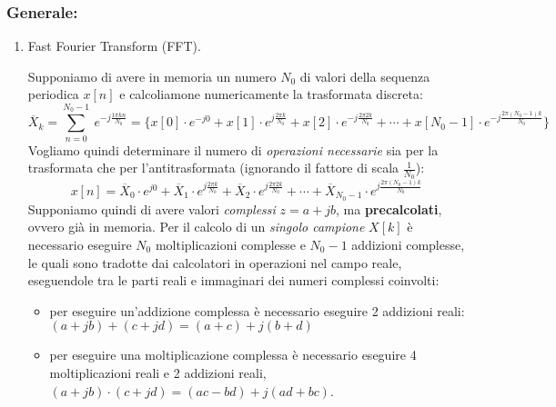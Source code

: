 \documentclass[
]{article}
\providecommand{\tightlist}{%
  \setlength{\itemsep}{0pt}\setlength{\parskip}{0pt}}
\begin{document}
\subsubsection{Generale:}\label{generale}

\begin{enumerate}
\def\labelenumi{\arabic{enumi}.}
\setcounter{enumi}{24}
\item
  Fast Fourier Transform (FFT).

  Supponiamo di avere in memoria un numero \(N_0\) di valori della
  sequenza periodica \(x[n]\) e calcoliamone numericamente la
  trasformata discreta: \[
  \overline{X}_k = \sum_{n=0}^{N_0 -1} \  e^{-j\frac{1\pi kn}{N_0}} =\Big\{ x[0]\cdot e^{-j0}+x[1]\cdot e^{j\frac{2\pi k}{N_0}}+x[2]\cdot e^{-j\frac{2\pi 2k}{N_0}} + \cdots + x[N_0 -1]\cdot e^{-j\frac{2\pi(N_0 -1)k}{N_0}}\Big\}
  \] Vogliamo quindi determinare il numero di \emph{operazioni
  necessarie} sia per la trasformata che per l'antitrasformata
  (ignorando il fattore di scala \(\frac{1}{N_0}\)): \[
  x[n] = \overline{X}_0 \cdot e^{j0}+\overline{X}_1\cdot e^{j\frac{2\pi k}{N_0}}+\overline{X}_2\cdot e^{j\frac{2\pi 2k}{N_0}} + \cdots + \overline{X}_{N_0 -1}\cdot e^{j\frac{2\pi(N_0 -1)k}{N_0}}
  \] Supponiamo quindi di avere valori \emph{complessi} \(z=a+jb\), ma
  \textbf{precalcolati}, ovvero già in memoria. Per il calcolo di un
  \emph{singolo campione} \(X[k]\) è necessario eseguire \(N_0\)
  moltiplicazioni complesse e \(N_0 -1\) addizioni complesse, le quali
  sono tradotte dai calcolatori in operazioni nel campo reale,
  eseguendole tra le parti reali e immaginari dei numeri complessi
  coinvolti:

  \begin{itemize}
  \tightlist
  \item
    per eseguire un'addizione complessa è necessario eseguire 2
    addizioni reali: \((a + jb) + (c + jd) = (a + c) + j(b + d)\)
  \item
    per eseguire una moltiplicazione complessa è necessario eseguire 4
    moltiplicazioni reali e 2 addizioni reali,
    \((a + jb) \cdot (c + jd) = (ac - bd) + j(ad + bc)\).
  \end{itemize}


\end{enumerate}
\end{document}
